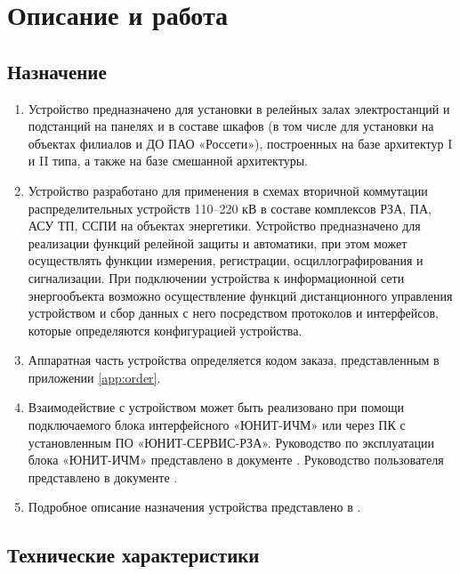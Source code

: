 {\color{unimain}\section[Описание и работа]{Описание и работа}}

{\color{unimain}\subsection{Назначение}}

\begin{enumerate}
\item Устройство предназначено для установки в релейных залах электростанций и подстанций на панелях и в составе шкафов (в том числе \cabinetlist для установки на объектах филиалов и ДО ПАО «Россети»), построенных на базе архитектур I и II типа, а также на базе смешанной архитектуры.
\item Устройство разработано для применения в схемах вторичной коммутации распределительных устройств 110–220 кВ в составе комплексов РЗА, ПА, АСУ ТП, ССПИ на объектах энергетики.
Устройство предназначено для реализации функций релейной защиты и автоматики, при этом может осуществлять функции измерения, регистрации, осциллографирования и сигнализации.
При подключении устройства к информационной сети энергообъекта возможно осуществление функций дистанционного управления устройством и сбор данных с него посредством протоколов и интерфейсов, которые определяются конфигурацией устройства.
\item Аппаратная часть устройства определяется кодом заказа, представленным в приложении \ref{app:order}.
\item Взаимодействие с устройством может быть реализовано при помощи подключаемого блока интерфейсного «ЮНИТ-ИЧМ» или через ПК с установленным ПО «ЮНИТ-СЕРВИС-РЗА». Руководство по эксплуатации блока «ЮНИТ-ИЧМ» представлено в документе \ManualUnitHMI. Руководство пользователя представлено в документе \ManualUnitSRZA.
\item Подробное описание назначения устройства представлено в \ManualUnitGeneral.
\end{enumerate}

{\color{unimain}\subsection{Технические характеристики}}


